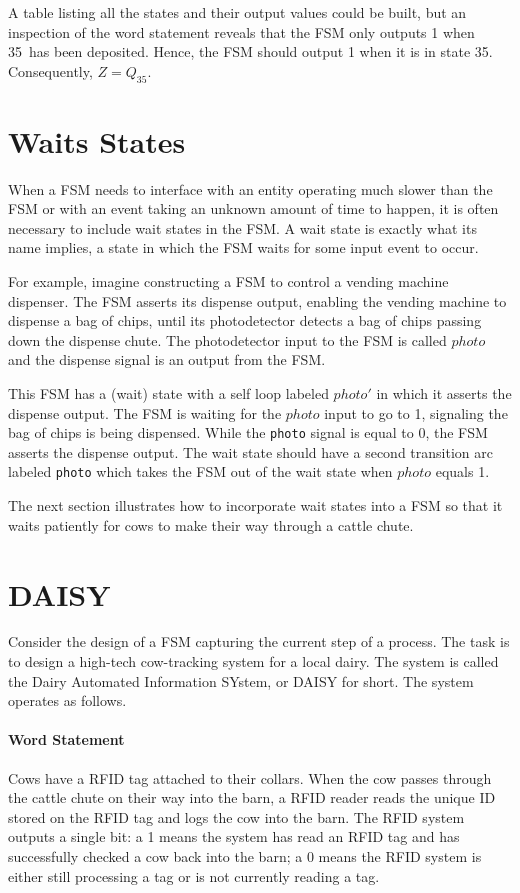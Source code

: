 A table listing all the states and their output values could be built,
but an inspection of the word statement reveals that the FSM only
outputs 1 when 35\textcent~has been deposited.  Hence, the FSM should
output 1 when it is in state 35\textcent.  Consequently, $Z=Q_{35}$.


\section{Waits States}
When a FSM needs to interface with an entity operating much
slower than the FSM or with an event taking an unknown amount 
of time to happen, it is often necessary to include wait states in 
the FSM.  A wait state is exactly what its name implies, a state in
which the FSM waits for some input event to occur.

For example, imagine  constructing a FSM to control
a vending machine dispenser.  The FSM asserts its dispense output, 
enabling the vending machine to dispense a bag of chips, until its 
photodetector detects a bag of chips passing down the
dispense chute.  The photodetector input to the FSM is called
$photo$ and the dispense signal is an output from the FSM.

This FSM has a (wait) state with a self loop labeled 
$photo'$ in which it asserts the dispense output.  The FSM is
waiting for the $photo$ input to go to 1, signaling the bag of
chips is being dispensed.  While the \verb+photo+ signal is equal to 
0, the FSM asserts the dispense output.  The wait state should have
a second transition arc labeled \verb+photo+ which takes the FSM out
of the wait state when $photo$ equals 1.

The next section illustrates how to incorporate wait states into 
a FSM so that it waits patiently for cows to make their way through a 
cattle chute.

\section{DAISY}
Consider the design of a FSM capturing the current step of a 
process. The task is to design a high-tech cow-tracking system
for a local dairy. The system is called the Dairy Automated Information 
SYstem, or DAISY for short.  The system operates as follows.

\paragraph{Word Statement}
Cows have a RFID tag attached to their collars.  When the cow passes through the 
cattle chute on their way into the barn, a RFID reader reads the unique 
ID stored on the RFID tag and logs the cow into the barn.  The RFID 
system outputs a single bit: a 1 means the system has read an 
RFID tag and has successfully checked a cow back into the barn; a 0 means 
the RFID system is either still processing a tag or is not 
currently reading a tag.


